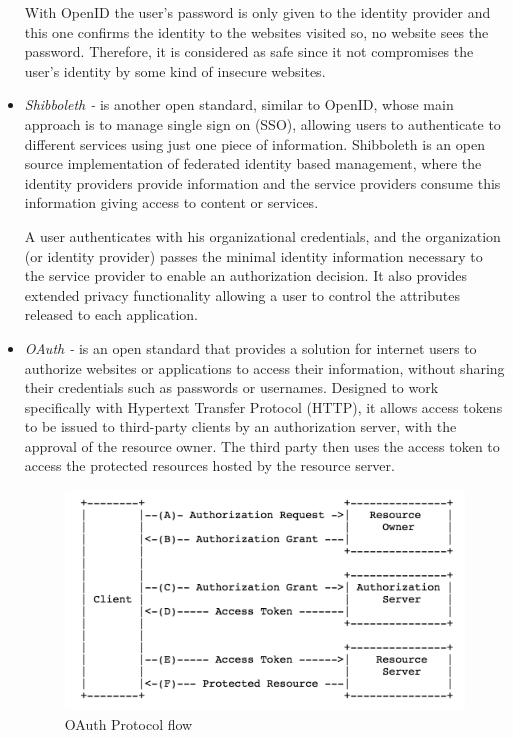 \begin{itemize}
With OpenID the user's password is only given to the identity provider and this one confirms the identity to the websites visited so, no website sees the password. Therefore, it is considered as safe since it not compromises the user's identity by some kind of insecure websites.\cite{cloud:openID}\\


\item {\it Shibboleth -} is another open standard, similar to OpenID, whose main approach is to manage single sign on (SSO), allowing users to authenticate to different services using just one piece of information.
Shibboleth is an open source implementation of federated identity based management, where the identity providers provide information and the service providers consume this information giving access to content or services. %

A user authenticates with his organizational credentials, and the organization (or identity provider) passes the minimal identity information necessary to the service provider to enable an authorization decision. It also provides extended privacy functionality allowing a user to control the attributes released to each application.\\ %


\item {\it OAuth - } is an open standard that provides a solution for internet users to authorize websites or applications to access their information, without sharing their credentials such as passwords or usernames.%
Designed to work specifically with Hypertext Transfer Protocol (HTTP), it allows access tokens to be issued to third-party clients by an authorization server, with the approval of the resource owner. The third party then uses the access token to access the protected resources hosted by the resource server. %

\begin{figure}[h]
    \centering
    \includegraphics[width=1.0\textwidth]{OAuth}
    \caption{OAuth Protocol flow}
    \label{fig:OAuth}
\end{figure}


\end{itemize}
